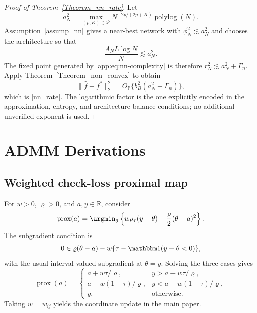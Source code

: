 \documentclass[twoside,11pt]{article}
\newenvironment{revision}{\color{revisionred}}{}
\begin{document}
\begin{revision}
\begin{proof}[Proof of Theorem~\ref{Theorem_nn_rate}]
Let
\[
 a_N^2=\max_{(p,K)\in\mathcal P}
 N^{-2p/(2p+K)}\operatorname{polylog}(N).
\]
Assumption~\ref{assump_nn} gives a near-best network with
$\phi_N^2\lesssim a_N^2$ and chooses the architecture so that
\begin{equation}
 \frac{A_NL\log N}{N}\lesssim a_N^2.                           \label{app:eq:nn-balance}
\end{equation}
The fixed point generated by \eqref{app:eq:nn-complexity} is therefore
$r_N^2\lesssim a_N^2+\Gamma_n$.  Apply
Theorem~\ref{Theorem_non_convex} to obtain
\[
 \|\widehat f-f^*\|_2^2
 =O_{\mathbb P}\{b_B^2(a_N^2+\Gamma_n)\},
\]
which is \eqref{nn_rate}.  The logarithmic factor is the one explicitly
encoded in the approximation, entropy, and architecture-balance conditions;
no additional unverified exponent is used.
\end{proof}


\section{ADMM Derivations}
\label{app:admm}

\subsection{Weighted check-loss proximal map}

For $w>0$, $\varrho>0$, and $a,y\in\mathbb R$, consider
\begin{equation}
 \operatorname{prox}(a)=\argmin_\theta
 \left\{w\rho_\tau(y-\theta)+\frac\varrho2(\theta-a)^2\right\}. \label{app:eq:prox-problem}
\end{equation}
The subgradient condition is
\[
 0\in \varrho(\theta-a)-w\{\tau-\mathbbm 1(y-\theta<0)\},
\]
with the usual interval-valued subgradient at $\theta=y$.  Solving the three
cases gives
\begin{equation}
 \operatorname{prox}(a)=
 \begin{cases}
 a+w\tau/\varrho,&y>a+w\tau/\varrho,\\
 a-w(1-\tau)/\varrho,&y<a-w(1-\tau)/\varrho,\\
 y,&\text{otherwise}.
 \end{cases}                                                    \label{app:eq:prox-solution}
\end{equation}
Taking $w=w_{ij}$ yields the coordinate update in the main paper.


\end{revision}
\end{document}
